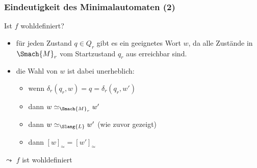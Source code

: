 \documentclass[aspectratio=1610,onlymath]{beamer}
\begin{document}
\begin{frame}[t]\frametitle{Eindeutigkeit des Minimalautomaten (2)}


%
\medskip

Ist $f$ wohldefiniert?\pause
\begin{itemize}
\item für jeden Zustand $q\in Q_r$ gibt es ein geeignetes Wort $w$, da alle Zustände in $\Smach{M}_r$ vom
Startzustand $q_r$ aus erreichbar sind.\pause
\item die Wahl von $w$ ist dabei unerheblich: 
\begin{itemize}
\item wenn $\delta_r(q_r,w)=q=\delta_r(q_r,w')$ 
\item dann $w\simeq_{\Smach{M}_r} w'$
\item dann $w\simeq_{\Slang{L}} w'$ (wie zuvor gezeigt)
\item dann $[w]_\simeq=[w']_\simeq$
\end{itemize}
\end{itemize}
\bigskip

$\leadsto$ $f$ ist wohldefiniert

\end{frame}
\end{document}
